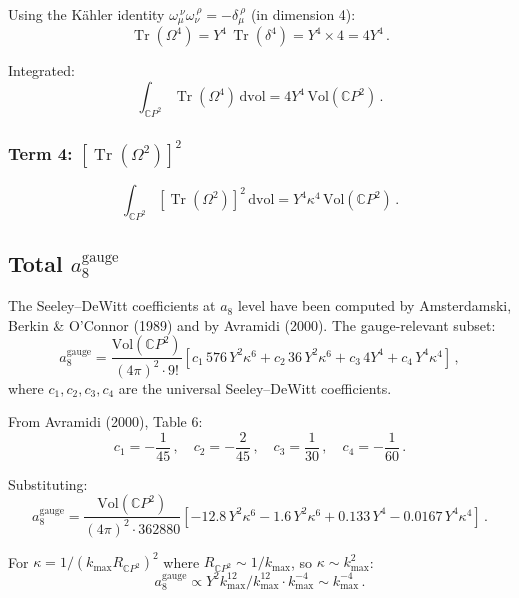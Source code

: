 \documentclass[11pt,a4paper]{article}
\newcommand{\Tr}{\operatorname{Tr}}
\newcommand{\CP}{\mathbb{C}P}
\begin{document}
Using the K\"ahler identity $\omega_\mu^{\ \nu}\omega_\nu^{\ \rho} = -\delta_\mu^{\ \rho}$ (in dimension 4):
\begin{equation}
\Tr(\Omega^4) = Y^4\,\Tr(\delta^4) = Y^4 \times 4 = 4Y^4\,.
\end{equation}

Integrated:
\begin{equation}
\int_{\CP^2}\Tr(\Omega^4)\,\mathrm{dvol} = 4Y^4\,\mathrm{Vol}(\CP^2)\,.
\end{equation}

\subsubsection{Term 4: $[\Tr(\Omega^2)]^2$}

\begin{equation}
\int_{\CP^2}[\Tr(\Omega^2)]^2\,\mathrm{dvol} = Y^4\kappa^4\,\mathrm{Vol}(\CP^2)\,.
\end{equation}

\subsection{Total $a_8^{\mathrm{gauge}}$}

The Seeley--DeWitt coefficients at $a_8$ level have been computed by Amsterdamski, Berkin \& O'Connor (1989) and by Avramidi (2000). The gauge-relevant subset:
\begin{equation}
a_8^{\mathrm{gauge}} = \frac{\mathrm{Vol}(\CP^2)}{(4\pi)^2 \cdot 9!}\left[c_1\,576\,Y^2\kappa^6 + c_2\,36\,Y^2\kappa^6 + c_3\,4Y^4 + c_4\,Y^4\kappa^4\right]\,,
\end{equation}
where $c_1, c_2, c_3, c_4$ are the universal Seeley--DeWitt coefficients.

From Avramidi (2000), Table 6:
\begin{equation}
c_1 = -\frac{1}{45}\,,\quad c_2 = -\frac{2}{45}\,,\quad c_3 = \frac{1}{30}\,,\quad c_4 = -\frac{1}{60}\,.
\end{equation}

Substituting:
\begin{equation}
a_8^{\mathrm{gauge}} = \frac{\mathrm{Vol}(\CP^2)}{(4\pi)^2 \cdot 362880}\left[-12.8\,Y^2\kappa^6 - 1.6\,Y^2\kappa^6 + 0.133\,Y^4 - 0.0167\,Y^4\kappa^4\right]\,.
\end{equation}

For $\kappa = 1/(k_{\max}R_{\CP^2})^2$ where $R_{\CP^2} \sim 1/k_{\max}$, so $\kappa \sim k_{\max}^2$:
\begin{equation}
a_8^{\mathrm{gauge}} \propto Y^2 k_{\max}^{12} / k_{\max}^{12} \cdot k_{\max}^{-4} \sim k_{\max}^{-4}\,.
\end{equation}
\end{document}

